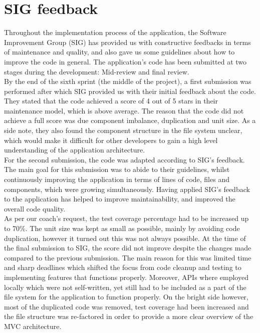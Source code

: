 \section{SIG feedback} %
Throughout the implementation process of the application, the Software Improvement Group (SIG) has provided us with constructive feedbacks in terms of 
maintenance and quality, and also gave us some guidelines about how to improve the code in general. The application's code has been submitted at two 
stages during the development: Mid-review and final review.\\

By the end of the sixth sprint (the middle of the project), a first submission was performed after which SIG provided us with their initial feedback 
about the code. They stated that the code achieved a score of 4 out of 5 stars in their maintenance model, which is above average. The reason that the 
code did not achieve a full score was due component imbalance, duplication and unit size. As a side note, they also found the component structure in the 
file system unclear, which would make it difficult for other developers to gain a high level understanding of the application architecture.\\

For the second submission, the code was adapted according to SIG's feedback. The main goal for this submission was to abide to their guidelines, whilst 
continuously improving the application in terms of lines of code, files and components, which were growing simultaneously. Having applied SIG's feedback 
to the application has helped to improve maintainability, and improved the overall code quality.\\
 
As per our coach's request, the test coverage percentage had to be increased up to 70\%. The unit size was kept as small as possible, mainly by avoiding 
code duplication, however it turned out this was not always possible. At the time of the final submission to SIG, the score did not improve despite the 
changes made compared to the previous submission. The main reason for this was limited time and sharp deadlines which shifted the focus from code 
cleanup and testing to implementing features that functions properly. Moreover, APIs where employed locally which were not self-written, yet still had 
to be included as a part of the file system for the application to function properly. On the bright side however, most of the duplicated code was 
removed, test coverage had been increased and the file structure was re-factored in order to provide a more clear overview of the MVC architecture.\\ 